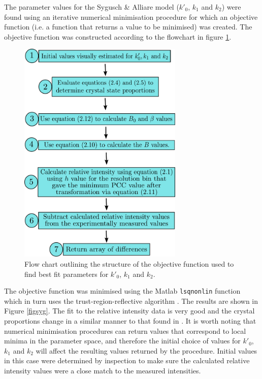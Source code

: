 The parameter values for the Sygusch \& Alliare model ($k'_0$, $k_1$ and $k_2$) were found using an iterative numerical minimisation procedure for which an objective function (i.e. a function that returns a value to be minimised) was created. The objective function was constructed according to the flowchart in figure \ref{figobjfun}.
\begin{figure}
  \centering
    \includegraphics[width=0.7\textwidth]{figures/dwd/objective_function_syg.pdf}
    \caption[Structure of the objective function to determine parameter values for dose decay models.]{Flow chart outlining the structure of the objective function used to find best fit parameters for $k'_0$, $k_1$ and $k_2$.}
    \label{figobjfun}
\end{figure}
The objective function was minimised using the Matlab \verb+lsqnonlin+ function which in turn uses the trust-region-reflective algorithm \cite{coleman1996}.
The results are shown in Figure \ref{figsyg}.
The fit to the relative intensity data is very good and the crystal proportions change in a similar manner to that found in \cite{owen2014}.
It is worth noting that numerical minimisation procedures can return values that correspond to local minima in the parameter space, and therefore the initial choice of values for $k'_0$, $k_1$ and $k_2$ will affect the resulting values returned by the procedure.
Initial values in this case were determined by inspection to make sure the calculated relative intensity values were a close match to the measured intensities.
